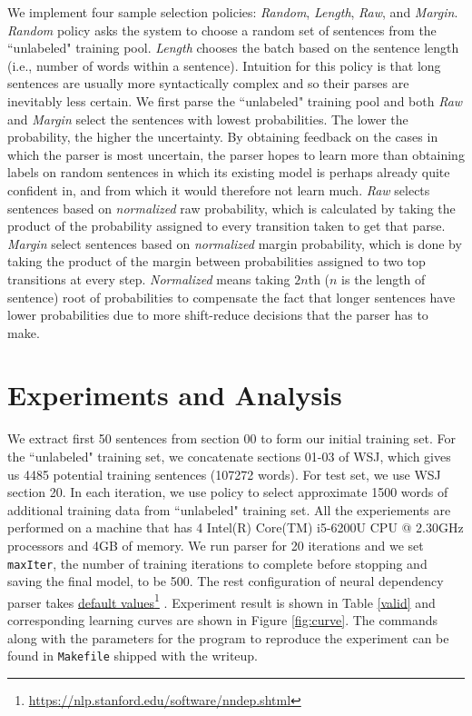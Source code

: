 \documentclass[11pt,letterpaper]{article}
\newcommand\fnurl[2]{%
  \href{#2}{#1}\footnote{\url{#2}}%
}
\begin{document}
We implement four sample selection policies: \emph{Random}, \emph{Length}, \emph{Raw}, and \emph{Margin}. \emph{Random} policy
asks the system to choose a random set of sentences from the ``unlabeled" training pool. \emph{Length} chooses the batch based on
the sentence length (i.e., number of words within a sentence). Intuition for this policy is that 
long sentences are usually more syntactically complex and so their parses are inevitably less certain. 
We first parse the ``unlabeled" training pool and both \emph{Raw} and \emph{Margin} select the sentences
with lowest probabilities. The lower the probability, the higher the uncertainty. By obtaining feedback on the cases 
in which the parser is most uncertain, the parser hopes to learn more than obtaining labels on random sentences in which 
its existing model is perhaps already quite confident in, and from which it would therefore not learn much. 
\emph{Raw} selects sentences based on \emph{normalized} raw probability, which is calculated by taking 
the product of the probability assigned to every transition taken to get that parse.
\emph{Margin} select sentences based on \emph{normalized} margin probability, which is done by
taking the product of the margin between probabilities assigned to two top transitions at every step. 
\emph{Normalized} means taking $2n$th ($n$ is the length of sentence) root of probabilities to compensate the fact
that longer sentences have lower probabilities due to more shift-reduce decisions that the parser has to make.

\section{Experiments and Analysis}
\label{ssec:layout}

We extract first 50 sentences from section 00 to form our initial training set. For the ``unlabeled" training set, 
we concatenate sections 01-03 of WSJ, which gives us 4485 potential training sentences (107272 words). For test set,
we use WSJ section 20. In each iteration, we use policy to select approximate 1500 words of additional training data
from ``unlabeled" training set. All the experiements are performed on
a machine that has 4 Intel(R) Core(TM) i5-6200U CPU @ 2.30GHz processors and 4GB of memory. 
We run parser for 20 iterations and we set \texttt{maxIter}, the number of training iterations to complete before stopping
and saving the final model, to be 500. The rest configuration of neural dependency parser takes \fnurl{default 
values}{https://nlp.stanford.edu/software/nndep.shtml}.
Experiment result is shown in Table \ref{valid} and corresponding learning curves are shown in Figure \ref{fig:curve}.
The commands along with the parameters for the program 
to reproduce the experiment can be found in \texttt{Makefile} shipped with the writeup.
\end{document}

